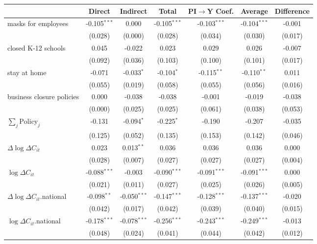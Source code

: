 
\begin{tabular}{lccccc|>{}c}
\toprule
  & Direct & Indirect & Total & PI$\to$Y Coef. & Average & Difference\\
\midrule
masks for employees & -0.105$^{***}$ & 0.000 & -0.105$^{***}$ & -0.103$^{***}$ & -0.104$^{***}$ & -0.001\\
 & (0.028) & (0.000) & (0.028) & (0.034) & (0.030) & (0.017)\\
closed K-12 schools & 0.045 & -0.022 & 0.023 & 0.029 & 0.026 & -0.007\\
 & (0.092) & (0.036) & (0.103) & (0.100) & (0.101) & (0.017)\\
stay at home & -0.071 & -0.033$^{*}$ & -0.104$^{*}$ & -0.115$^{**}$ & -0.110$^{**}$ & 0.011\\
 & (0.055) & (0.019) & (0.058) & (0.055) & (0.056) & (0.016)\\
business closure policies & 0.000 & -0.038 & -0.038 & -0.001 & -0.019 & -0.038\\
 & (0.000) & (0.025) & (0.025) & (0.061) & (0.038) & (0.053)\\
$\sum_j \mathrm{Policy}_j$ & -0.131 & -0.094$^{*}$ & -0.225$^{*}$ & -0.190 & -0.207 & -0.035\\
 & (0.125) & (0.052) & (0.135) & (0.153) & (0.142) & (0.046)\\
$\Delta \log \Delta C_{it}$ & 0.023 & 0.013$^{**}$ & 0.036 & 0.036 & 0.036 & 0.000\\
 & (0.028) & (0.007) & (0.027) & (0.027) & (0.027) & (0.004)\\
$\log \Delta C_{it}$ & -0.088$^{***}$ & -0.003 & -0.090$^{***}$ & -0.091$^{***}$ & -0.091$^{***}$ & 0.000\\
 & (0.021) & (0.011) & (0.027) & (0.025) & (0.026) & (0.005)\\
$\Delta \log \Delta C_{it}$.national & -0.098$^{**}$ & -0.050$^{***}$ & -0.147$^{***}$ & -0.128$^{***}$ & -0.137$^{***}$ & -0.020\\
 & (0.042) & (0.017) & (0.042) & (0.039) & (0.040) & (0.015)\\
$\log \Delta C_{it}$.national & -0.178$^{***}$ & -0.078$^{***}$ & -0.256$^{***}$ & -0.243$^{***}$ & -0.249$^{***}$ & -0.013\\
 & (0.048) & (0.024) & (0.041) & (0.044) & (0.042) & (0.012)\\
\bottomrule
\end{tabular}